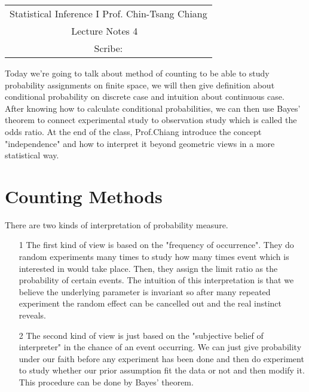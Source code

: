 \documentclass[../Probability_Theory.tex]{subfiles}
\begin{document}
	\begin{center}
		\renewcommand{\arraystretch}{2}
		\begin{bfseries}
			\begin{tabular}{|c|}
				\hline
				Statistical Inference I \hfill Prof. Chin-Tsang Chiang\\
				\hspace{15em} {\large Lecture Notes 4} \hspace{15em}\ \\
				\lecdate \hfill Scribe: \scribe\\
				\hline
			\end{tabular}
			\renewcommand{\arraystretch}{1}
		\end{bfseries}
	\end{center}
Today we're going to talk about method of counting to be able to study probability assignments on finite space, we will then give definition about conditional probability on discrete case and intuition about continuous case. After knowing how to calculate conditional probabilities, we can then use Bayes' theorem to connect experimental study to observation study which is called the odds ratio. At the end of the class, Prof.Chiang introduce the concept "independence" and how to interpret it beyond geometric views in a more statistical way.
\section{Counting Methods}
  There are two kinds of interpretation of probability measure. 
\begin{enumerate}
\item[1]
  The first kind of view is based on the "frequency of occurrence". They do random experiments many times to study  how many times event which is interested in would take place. Then, they assign the limit ratio  as the probability of certain events. The intuition of this interpretation is that we believe the underlying parameter is invariant so after many repeated experiment the random effect can be cancelled out and the real instinct reveals. 
\item[2]
  The second kind of view is just based on the "subjective belief of interpreter" in the chance of an event occurring.  We can just give probability under our faith before any experiment has been done and then do experiment to study whether our prior assumption fit the data or not and then modify it. This procedure can be done by Bayes' theorem. 
\end{enumerate}
\end{document}
